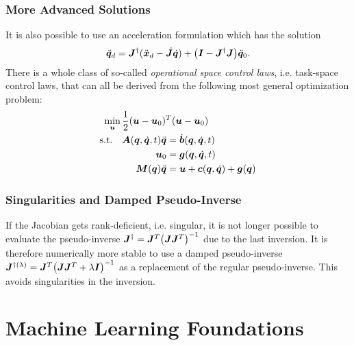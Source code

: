 		\subsection{More Advanced Solutions}
			It is also possible to use an acceleration formulation which has the solution
			\begin{equation*}
				\ddot{\bm{q}}_d = \bm{J}^\dagger ( \ddot{\bm{x}}_d - \dot{\bm{J}} \dot{\bm{q}} ) + \big( \bm{I} - \bm{J}^\dagger \bm{J} \big) \ddot{\bm{q}}_0.
			\end{equation*}
			There is a whole class of so-called \emph{operational space control laws}, i.e. task-space control laws, that can all be derived from the following most general optimization problem:
			\begin{equation*}
				\begin{aligned}
					\min_{\bm{u}} \,& \frac{1}{2} (\bm{u} - \bm{u}_0)^T (\bm{u} - \bm{u}_0) \\
					\mathrm{s.t.} \quad&
						\begin{aligned}[t]
							\bm{A}(\bm{q}, \dot{\bm{q}}, t) \ddot{\bm{q}} &= \dot{\bm{b}}(\bm{q}, \dot{\bm{q}}, t) \\
							                                        \bm{u}_0 &= \bm{g}(\bm{q}, \dot{\bm{q}}, t) \\
							                  \bm{M}(\bm{q}) \ddot{\bm{q}} &= \bm{u} + \bm{c}(\bm{q}, \dot{\bm{q}}) + \bm{g}(\bm{q})
						\end{aligned}
				\end{aligned}
			\end{equation*}

		\subsection{Singularities and Damped Pseudo-Inverse}
			If the Jacobian gets rank-deficient, i.e. singular, it is not longer possible to evaluate the pseudo-inverse \( \bm{J}^\dagger = \bm{J}^T \big( \bm{J} \bm{J}^T \big)^{-1} \) due to the last inversion. It is therefore numerically more stable to use a damped pseudo-inverse \( \bm{J}^{\dagger(\lambda)} = \bm{J}^T \big( \bm{J} \bm{J}^T + \lambda \bm{I} \big)^{-1} \) as a replacement of the regular pseudo-inverse. This avoids singularities in the inversion.

\chapter{Machine Learning Foundations} %


